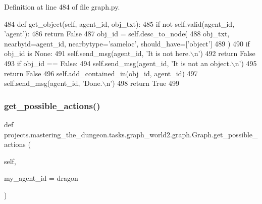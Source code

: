 Definition at line 484 of file graph.\+py.


\begin{DoxyCode}
484     \textcolor{keyword}{def }get\_object(self, agent\_id, obj\_txt):
485         \textcolor{keywordflow}{if} \textcolor{keywordflow}{not} self.valid(agent\_id, \textcolor{stringliteral}{'agent'}):
486             \textcolor{keywordflow}{return} \textcolor{keyword}{False}
487         obj\_id = self.desc\_to\_node(
488             obj\_txt, nearbyid=agent\_id, nearbytype=\textcolor{stringliteral}{'sameloc'}, should\_have=[\textcolor{stringliteral}{'object'}]
489         )
490         \textcolor{keywordflow}{if} obj\_id \textcolor{keywordflow}{is} \textcolor{keywordtype}{None}:
491             self.send\_msg(agent\_id, \textcolor{stringliteral}{'It is not here.\(\backslash\)n'})
492             \textcolor{keywordflow}{return} \textcolor{keyword}{False}
493         \textcolor{keywordflow}{if} obj\_id == \textcolor{keyword}{False}:
494             self.send\_msg(agent\_id, \textcolor{stringliteral}{'It is not an object.\(\backslash\)n'})
495             \textcolor{keywordflow}{return} \textcolor{keyword}{False}
496         self.add\_contained\_in(obj\_id, agent\_id)
497         self.send\_msg(agent\_id, \textcolor{stringliteral}{'Done.\(\backslash\)n'})
498         \textcolor{keywordflow}{return} \textcolor{keyword}{True}
499 
\end{DoxyCode}
\mbox{\label{classprojects_1_1mastering__the__dungeon_1_1tasks_1_1graph__world2_1_1graph_1_1Graph_a0d9e8f386ec8cb4a8b1235f8e7f7086d}} 
\subsubsection{\texorpdfstring{get\+\_\+possible\+\_\+actions()}{get\_possible\_actions()}}
{\footnotesize\ttfamily def projects.\+mastering\+\_\+the\+\_\+dungeon.\+tasks.\+graph\+\_\+world2.\+graph.\+Graph.\+get\+\_\+possible\+\_\+actions (\begin{DoxyParamCaption}\item[{}]{self,  }\item[{}]{my\+\_\+agent\+\_\+id = {\ttfamily \textquotesingle{}dragon\textquotesingle{}} }\end{DoxyParamCaption})}



